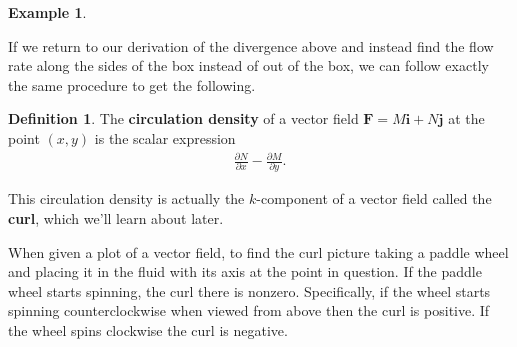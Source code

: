 \documentclass[12pt, letter]{article}
\theoremstyle{plain}
\numberwithin{theorem}{section}
\theoremstyle{definition}
\newtheorem{definition}[theorem]{Definition}
\newtheorem{example}[theorem]{Example}
\begin{document}
\begin{example}
\end{example}

\bigskip

\hrulefill

\bigskip

If we return to our derivation of the divergence above and instead find the flow rate along the sides of the box instead of out of the box, we can follow exactly the same procedure to get the following.

\bigskip

\begin{definition}
The \textbf{circulation density} of a vector field $\bm{F}=M\bm{i}+N\bm{j}$ at the point $(x,y)$ is the scalar expression
\begin{align*}
\frac{\partial N}{\partial x}-\frac{\partial M}{\partial y}.
\end{align*}
\end{definition}

\bigskip

This circulation density is actually the $k$-component of a vector field called the \textbf{curl}, which we'll learn about later.

\bigskip

\hrulefill

\bigskip

When given a plot of a vector field, to find the curl picture taking a paddle wheel and placing it in the fluid with its axis at the point in question. If the paddle wheel starts spinning, the curl there is nonzero. Specifically, if the wheel starts spinning counterclockwise when viewed from above then the curl is positive. If the wheel spins clockwise the curl is negative.

\bigskip

\hrulefill

\bigskip
\end{document}
